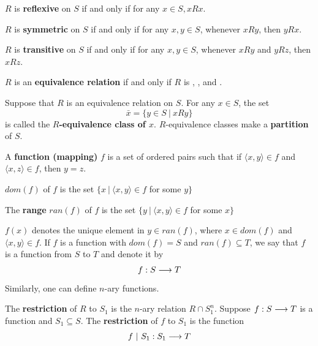 \documentclass[english, 11pt]{article}
\begin{document}
  \begin{defn}[reflexive]\label{reflexive}
  $R$ is \textbf{reflexive} on $S$ if and only if for any $x \in S, xRx$.
  \end{defn}
  \begin{defn}[symmetric]\label{symmetric}
  $R$ is \textbf{symmetric} on $S$ if and only if for any $x,y \in S$, whenever $xRy$, then $yRx$.
  \end{defn}
  \begin{defn}[transitive]\label{transitive}
  $R$ is \textbf{transitive} on $S$ if and only if for any $x, y \in S$, whenever $xRy$ and $yRz$, then $xRz$.
  \end{defn}
  \begin{defn}\label{equivalence relation}
  $R$ is an \textbf{equivalence relation} if and only if $R$ is , , and .
  \end{defn}
  \begin{defn}[$R$-equivalence]\label{R-equivalence}
  Suppose that $R$ is an equivalence relation on $S$. For any $x \in S$, the set
  \[ \bar{x} = \{ y \in S \ | \ xRy\} \]
  is called the \textbf{$R$-equivalence class of $x$}. $R$-equivalence classes make a \textbf{partition} of $S$.
  \end{defn}
  \begin{defn}[function]\label{function}
  A \textbf{function (mapping)} $f$ is a set of ordered pairs such that if $\langle x , y \rangle \in f$ and $\langle x , z \rangle \in f$, then $y = z$.
  \end{defn}
  \begin{defn}[domain]\label{domain}
  $dom(f)$ of $f$ is the set $\{x \ | \ \langle x,y\rangle \in f$ for some $y \}$
  \end{defn}
  \begin{defn}[range]\label{range}
  The \textbf{range} $ran(f)$ of $f$ is the set $\{ y \ | \ \langle x, y \rangle \in f$ for some $x \}$
  \end{defn}
  $f(x)$ denotes the unique element in $y \in ran(f)$, where $x \in dom(f)$ and $\langle x , y \rangle \in f$. If $f$ is a function with $dom(f) = S$ and $ran(f) \subseteq T$, we say that $f$ is a function from $S$ to $T$ and denote it by
  \[ f: S \longrightarrow T \]
  Similarly, one can define $n$-ary functions.
  \begin{defn}[restriction]\label{restriction}
  The \textbf{restriction} of $R$ to $S_1$ is the $n$-ary relation $R \cap S_1^n$. Suppose $f : S \longrightarrow T$ is a function and $S_1 \subseteq S$. The \textbf{restriction} of $f$ to $S_1$ is the function
  \[ f \ | \ S_1 : S_1 \longrightarrow T \]
  \end{defn}
\end{document}
